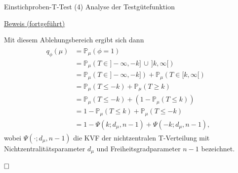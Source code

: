 \documentclass[
  8pt,
  ignorenonframetext,
]{beamer}
\begin{document}
\begin{frame}{Einstichproben-T-Test \textbar{} (4) Analyse der
Testgütefunktion}
\protect\hypertarget{einstichproben-t-test-4-analyse-der-testguxfctefunktion-3}{}

\footnotesize

\underline{Beweis (fortgeführt)}

Mit diesem Ablehungsbereich ergibt sich dann \begin{align}
\begin{split}
q_\phi(\mu)
& = \mathbb{P}_{\mu}(\phi = 1)                                                   \\
& = \mathbb{P}_{\mu}\left(T \in ]-\infty, -k]\,
                         \cup \,]k,\infty[ \right)                               \\
& = \mathbb{P}_{\mu}\left(T \in ]-\infty, -k]\right)
  + \mathbb{P}_{\mu}\left(T \in [k,\infty[ \right)                               \\
& = \mathbb{P}_{\mu}(T \le -k)  + \mathbb{P}_{\mu}(T \ge k)                      \\
& = \mathbb{P}_{\mu}(T \le -k)  + (1-\mathbb{P}_{\mu}(T \le k))                  \\
& = 1 - \mathbb{P}_{\mu}(T \le k)  + \mathbb{P}_{\mu}(T \le - k)                 \\
& = 1 - \Psi(k; d_\mu, n-1)  + \Psi(-k;d_\mu,n-1),
\end{split}
\end{align} wobei \(\Psi(\cdot; d_\mu,n-1)\) die KVF der nichtzentralen
T-Verteilung mit Nichtzentralitätsparameter \(d_\mu\) und
Freiheitsgradparameter \(n-1\) bezeichnet.

\(\hfill\Box\) \vfill
\end{frame}
\end{document}
